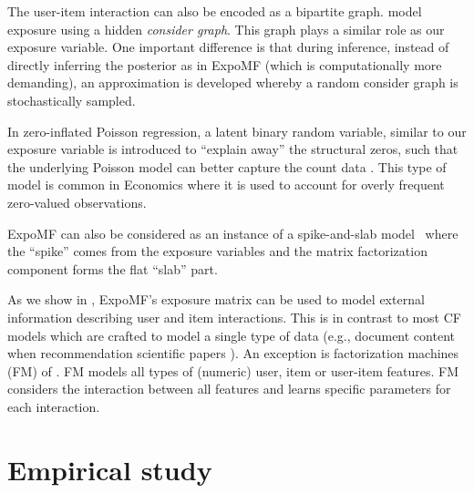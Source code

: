  The user-item
interaction can also be encoded as a bipartite graph.
\citet{paquet2013one} model exposure using a hidden \emph{consider graph}.
This graph plays a similar role as our exposure variable. One important
difference is that during inference, instead of directly inferring the
posterior as in ExpoMF (which is computationally more demanding), an
approximation is developed whereby a random consider graph is
stochastically sampled.


 In zero-inflated Poisson regression, a
latent binary random variable, similar to our exposure variable is introduced to ``explain away'' the structural zeros, such that the
underlying Poisson model can better capture the count data
\cite{lambert1992zero}. This type of model is common in Economics where it is used
to account for overly frequent zero-valued observations.  

ExpoMF can also be considered as an instance of a spike-and-slab model~\cite{ishwaran2005spike} where the ``spike'' comes from the exposure variables and the matrix factorization component forms the flat ``slab'' part. 

 As we show in ,
ExpoMF's exposure matrix can be used to model external information describing user
and item interactions. This is in contrast to most CF models which are
crafted to model a single type of data (e.g., document content when
recommendation scientific papers \cite{wang2011collaborative}). An exception is
factorization machines (FM) of \citet{rendle2010fm}. FM models all types of
(numeric) user, item or user-item features. FM considers the interaction
between all features and learns specific parameters for each interaction.


\section{Empirical study}
\label{sec:experiments}

